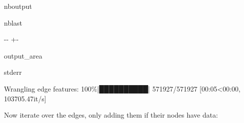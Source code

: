 \documentclass[letterpaper,10pt,english]{sphinxhowto}
\begin{document}
\begin{sphinxuseclass}{nboutput}
\begin{sphinxuseclass}{nblast}
{

\kern-\sphinxverbatimsmallskipamount\kern-\baselineskip
\kern+\FrameHeightAdjust\kern-\fboxrule
\vspace{\nbsphinxcodecellspacing}

\begin{sphinxuseclass}{output_area}
\begin{sphinxuseclass}{stderr}


\begin{sphinxVerbatim}[commandchars=\\\{\}]
Wrangling edge features: 100\%|██████████| 571927/571927 [00:05<00:00, 103705.47it/s]
\end{sphinxVerbatim}



\end{sphinxuseclass}
\end{sphinxuseclass}
}

\end{sphinxuseclass}
\end{sphinxuseclass}
\sphinxAtStartPar
Now iterate over the edges, only adding them if their nodes have data:
\end{document}
